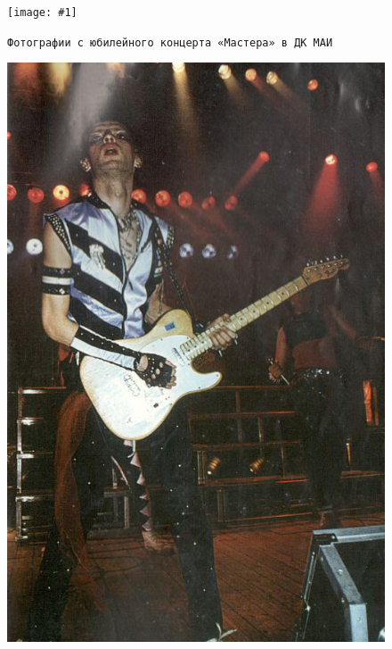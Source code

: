 \documentclass[16pt,a5paper]{book}
\newcommand{\myincludegraphics}[1]{\texttt{[image: \#1]}}
\begin{document}
\begin{figure}[h]
    \centering
    \myincludegraphics{Image37}
    \caption{\texttt{Фотографии с юбилейного концерта «Мастера» в ДК МАИ}}
\end{figure}


\begin{figure}[!ht]
    \centering
    \includegraphics[width=\paperwidth,height=\paperheight]{Cover3}
    \caption*{}
\end{figure}
\end{document}
